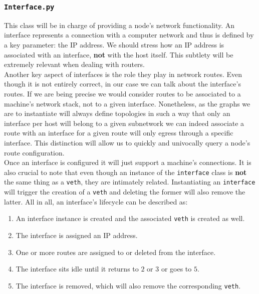             \subsubsection{\texttt{Interface.py}}
                This class will be in charge of providing a node's network functionality. An interface represents a connection with a computer network and thus is defined by a key parameter: the IP address. We should stress how an IP address is associated with an interface, \textbf{not} with the host itself. This subtlety will be extremely relevant when dealing with routers.\\

                Another key aspect of interfaces is the role they play in network routes. Even though it is not entirely correct, in our case we can talk about the interface's routes. If we are being precise we would consider routes to be associated to a machine's network stack, not to a given interface. Nonetheless, as the graphs we are to instantiate will always define topologies in such a way that only an interface per host will belong to a given subnetwork we can indeed associate a route with an interface for a given route will only egress through a specific interface. This distinction will allow us to quickly and univocally query a node's route configuration.\\

                Once an interface is configured it will just support a machine's connections. It is also crucial to note that even though an instance of the \texttt{interface} class is \textbf{not} the same thing as a \texttt{veth}, they are intimately related. Instantiating an \texttt{interface} will trigger the creation of a \texttt{veth} and deleting the former will also remove the latter. All in all, an interface's lifecycle can be described as:

                \begin{enumerate}
                    \item An interface instance is created and the associated \texttt{veth} is created as well.
                    \item The interface is assigned an IP address.
                    \item One or more routes are assigned to or deleted from the interface.
                    \item The interface sits idle until it returns to $2$ or $3$ or goes to $5$.
                    \item The interface is removed, which will also remove the corresponding \texttt{veth}.
                \end{enumerate}


